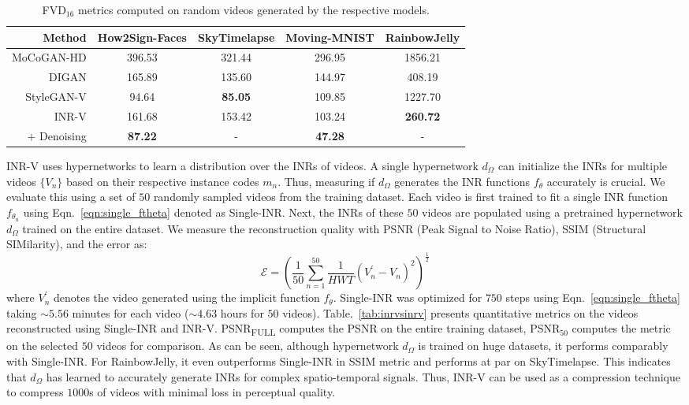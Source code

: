 \documentclass[10pt]{article} \usepackage[accepted]{tmlr}
\begin{document}
\begingroup
\label{tab:metrics}
\begin{table*}[t]
\centering
\begin{tabularx}{0.83\textwidth}{r|cccc}
  \toprule
    Method & How2Sign-Faces & SkyTimelapse & Moving-MNIST & RainbowJelly \\
    \midrule
    MoCoGAN-HD & 396.53 & 321.44 & 296.95 & 1856.21 
    \\
    DIGAN & 165.89 & 135.60 & 144.97 & 408.19
    \\
    StyleGAN-V & 94.64 & \textbf{85.05} & 109.85 & 1227.70
    \\
    \midrule
    INR-V & 161.68 & 153.42 & 103.24 & \textbf{260.72} 
    \\
    $+$ Denoising & \textbf{87.22} & - & \textbf{47.28} & -
    \\
    \bottomrule
  \end{tabularx}
  \caption{ FVD$_{16}$ metrics computed on random videos generated by the respective models. }
  \label{tab:main_results}
\end{table*}
\endgroup

INR-V uses hypernetworks to learn a distribution over the INRs of videos. A single hypernetwork $d_\Omega$ can initialize the INRs for multiple videos $\{V_n\}$ based on their respective instance codes $m_n$. Thus, measuring if $d_\Omega$ generates the INR functions $f_\theta$ accurately is crucial.
We evaluate this using a set of $50$ randomly sampled videos from the training dataset.  
Each video is first trained to fit a single INR function $f_{\theta_n}$ using Eqn.~\ref{eqn:single_ftheta} denoted as Single-INR. Next, the INRs of these $50$ videos are populated using a pretrained hypernetwork $d_\Omega$ trained on the entire dataset. We measure the reconstruction quality with PSNR (Peak Signal to Noise Ratio), SSIM (Structural SIMilarity), and the error as:
\begin{equation}
     \mathcal{E} = \left( \frac{1}{50}\sum_{n=1}^{50}\frac{1}{HWT}(V_n^{'} - V_n)^2\right)^\frac{1}{2}
    \label{eqn:error-inr-inrv}
\end{equation}
where $V_n^{'}$ denotes the video generated using the implicit function $f_\theta$. Single-INR was optimized for $750$ steps using Eqn.~\ref{eqn:single_ftheta} taking $\sim5.56$ minutes for each video ($\sim4.63$ hours for $50$ videos).
Table.~\ref{tab:inrvsinrv} presents quantitative metrics on the videos reconstructed using Single-INR and INR-V. PSNR\textsubscript{FULL} computes the PSNR on the entire training dataset, PSNR$_{50}$ computes the metric on the selected $50$ videos for comparison. 
As can be seen, 
although hypernetwork $d_\Omega$ is trained on huge datasets, it performs comparably with Single-INR. For RainbowJelly, it even outperforms Single-INR in SSIM metric and performs at par on SkyTimelapse. 
This indicates that $d_\Omega$ has learned to accurately generate INRs for complex spatio-temporal signals. Thus, INR-V can be used as a compression technique to compress $1000$s of videos with minimal loss in perceptual quality. 
\end{document}
